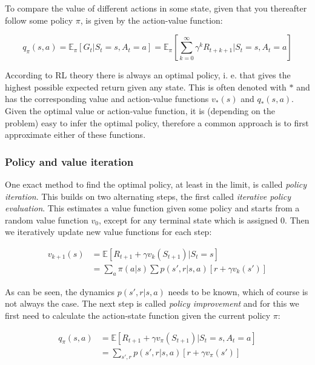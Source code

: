 To compare the value of different actions in some state, given that you thereafter follow some policy $\pi$,
is given by the action-value function:

\begin{equation}
    q_\pi(s, a) = \mathbb{E}_\pi\left[G_t|S_t=s,A_t=a\right] = \mathbb{E}_\pi\left[\sum_{k=0}^\infty \gamma^k R_{t+k+1}|S_t=s,A_t=a\right]
\end{equation}

According to RL theory there is always an optimal policy, i. e. that gives the
highest possible expected return given any state. This is often denoted with
$*$ and has the corresponding value and action-value functions $v_*(s)$ and
$q_*(s, a)$. Given the optimal value or action-value function, it is (depending
on the problem) easy to infer the optimal policy, therefore a common approach
is to first approximate either of these functions.

\subsubsection{Policy and value iteration}

One exact method to find the optimal policy, at least in the limit, is called
\textit{policy iteration}. This builds on two alternating steps, the first
called \textit{iterative policy evaluation}. This estimates a value function
given some policy and starts from a random value function $v_0$, except for any
terminal state which is assigned $0$. Then we iteratively update new value
functions for each step:

\begin{align*}
    v_{k+1}(s) &= \mathbb{E}\left[R_{t+1} + \gamma v_{k}(S_{t+1}) | S_t=s \right] \\
               &= \sum_a \pi (a|s) \sum p(s', r|s, a) \left[r + \gamma v_k(s')\right]
\end{align*}

As can be seen, the dynamics $p(s', r|s, a)$ needs to be known, which of course
is not always the case. The next step is called \textit{policy improvement} and for this
we first need to calculate the action-state function given the current policy
$\pi$:

\begin{align*}
    q_\pi(s, a) &= \mathbb{E}\left[R_{t+1} + \gamma v_\pi(S_{t+1}) | S_t=s, A_t = a \right] \\
                &= \sum_{s', r} p(s', r|s, a) \left[r + \gamma v_\pi(s')\right]
\end{align*}

